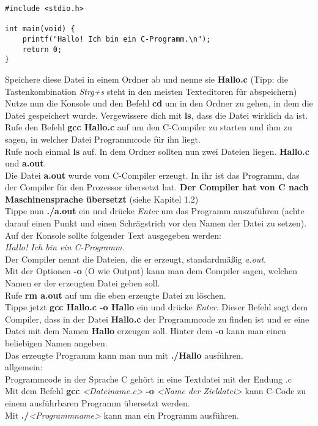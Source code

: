 \documentclass[c_worksheet.tex]{subfiles}
\begin{document}
\begin{lstlisting}
#include <stdio.h>

int main(void) {
    printf("Hallo! Ich bin ein C-Programm.\n");
    return 0;
}
\end{lstlisting}

Speichere diese Datei in einem Ordner ab und nenne sie \textbf{Hallo.c} (Tipp: die Tastenkombination \textit{Strg+s} steht in den meisten Texteditoren für abspeichern)\\
Nutze nun die Konsole und den Befehl \textbf{cd} um in den Ordner zu gehen, in dem die Datei gespeichert wurde. Vergewissere dich mit \textbf{ls}, dass die Datei wirklich da ist.\\
Rufe den Befehl \textbf{gcc Hallo.c} auf um den C-Compiler zu starten und ihm zu sagen, in welcher Datei Programmcode für ihn liegt.\\
Rufe noch einmal \textbf{ls} auf. In dem Ordner sollten nun zwei Dateien liegen. \textbf{Hallo.c} und \textbf{a.out}.\\
Die Datei \textbf{a.out} wurde vom C-Compiler erzeugt. In ihr ist das Programm, das der Compiler für den Prozessor übersetzt hat.
\textbf{Der Compiler hat von C nach Maschinensprache übersetzt} (siehe Kapitel 1.2) \\
Tippe nun \textbf{./a.out} ein und drücke \textit{Enter} um das Programm auszuführen (achte darauf einen Punkt und einen Schrägstrich vor den Namen der Datei zu setzen). Auf der Konsole sollte folgender Text ausgegeben werden:\\

\textit{Hallo! Ich bin ein C-Programm.}\\

Der Compiler nennt die Dateien, die er erzeugt, standardmäßig \textit{a.out}.\\
Mit der Optionen \textbf{-o} (O wie Output) kann man dem Compiler sagen, welchen Namen er der erzeugten Datei geben soll.\\
Rufe \textbf{rm a.out} auf um die eben erzeugte Datei zu löschen.\\
Tippe jetzt \textbf{gcc Hallo.c -o Hallo} ein und drücke \textit{Enter}. Dieser Befehl sagt dem Compiler, dass in der Datei \textbf{Hallo.c} der Programmcode zu finden ist und er eine Datei mit dem Namen \textbf{Hallo} erzeugen soll. Hinter dem \textbf{-o} kann man einen beliebigen Namen angeben.\\
Das erzeugte Programm kann man nun mit \textbf{./Hallo} ausführen.\\

allgemein:\\
Programmcode in der Sprache C gehört in eine Textdatei mit der Endung .c\\
Mit dem Befehl \textbf{gcc} \textit{<Dateiname.c>} \textbf{-o} \textit{<Name der Zieldatei>} kann C-Code zu einem ausführbaren Programm übersetzt werden.\\
Mit \textbf{./}\textit{<Programmname>} kann man ein Programm ausführen.
\end{document}

